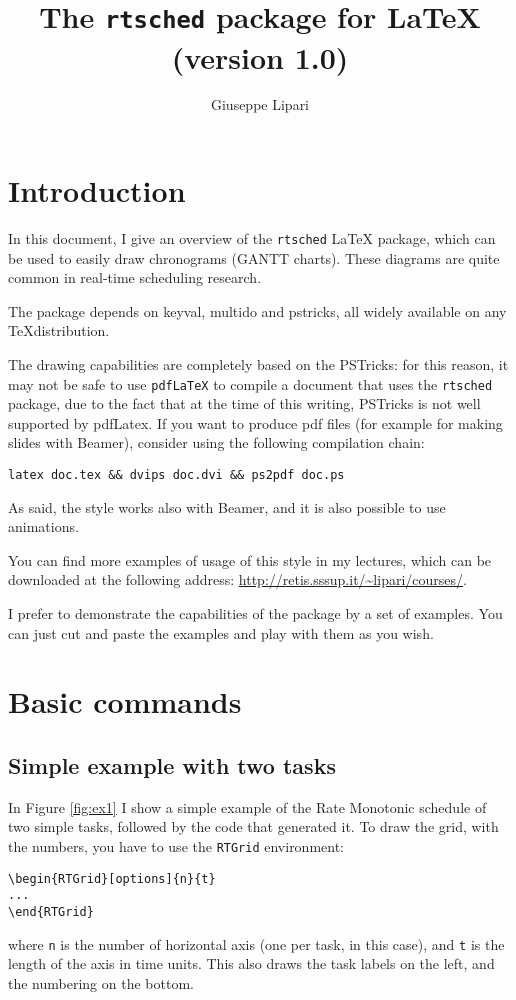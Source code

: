 \documentclass{article}
\title{The \texttt{rtsched} package for \LaTeX \\ (version 1.0)}
\author{Giuseppe Lipari}
\begin{document}
\maketitle

\listoffigures

\section{Introduction}

In this document, I give an overview of the \texttt{rtsched} \LaTeX
package, which can be used to easily draw chronograms (GANTT charts).
These diagrams are quite common in real-time scheduling research.

The package depends on keyval, multido and pstricks, all widely
available on any \TeX distribution.

The drawing capabilities are completely based on the PSTricks: for
this reason, it may not be safe to use \texttt{pdfLaTeX} to compile a
document that uses the \texttt{rtsched} package, due to the fact that
at the time of this writing, PSTricks is not well supported by
pdfLatex. If you want to produce pdf files (for example for making
slides with Beamer), consider using the following compilation chain:

\begin{verbatim}
latex doc.tex && dvips doc.dvi && ps2pdf doc.ps 
\end{verbatim}

As said, the style works also with Beamer, and it is also possible to
use animations.

You can find more examples of usage of this style in my lectures,
which can be downloaded at the following address:
\url{http://retis.sssup.it/~lipari/courses/}.

I prefer to demonstrate the capabilities of the package by a set of
examples. You can just cut and paste the examples and play with them
as you wish.

\section{Basic commands}

\subsection{Simple example with two tasks}

In Figure \ref{fig:ex1} I show a simple example of the Rate Monotonic
schedule of two simple tasks, followed by the code that generated it.
To draw the grid, with the numbers, you have to use the
\texttt{RTGrid} environment:
\begin{verbatim}
\begin{RTGrid}[options]{n}{t}
...
\end{RTGrid}
\end{verbatim}
\noindent where \texttt{n} is the number of horizontal axis (one per
task, in this case), and \texttt{t} is the length of the axis in time
units. This also draws the task labels on the left, and the numbering
on the bottom.
\end{document}
